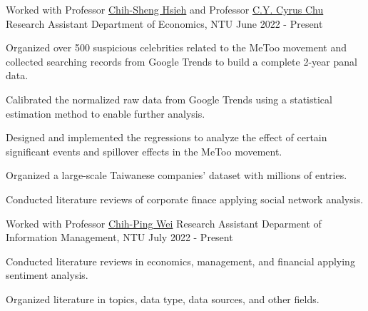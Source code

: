 \newcommand{\prof}[2]{Professor \textcolor{awesome}{\href{#1}{#2}}}

\begin{cventries}

  \cventry
  {Worked with \prof{https://sites.google.com/site/chihshenghsieh/}{Chih-Sheng Hsieh}
  and \prof{https://sites.google.com/view/cyruschu}{C.Y. Cyrus Chu}}
    {Research Assistant} %
    {Department of Economics, NTU} %
    {June 2022 - Present} %
    {
        \begin{cvitems}
        \item {Organized over 500 suspicious celebrities 
            related to the MeToo movement
            and collected searching records from Google Trends 
            to build a complete 2-year panal data.}
        \item {Calibrated the normalized raw data from Google Trends
            using a statistical estimation method
            to enable further analysis.}
        \item {Designed and implemented the regressions 
            to analyze the effect of certain significant events and 
            spillover effects in the MeToo movement.}
        \item {Organized a large-scale Taiwanese companies' dataset
            with millions of entries.}
        \item {Conducted literature reviews of corporate finace 
                applying social network analysis.}
        \end{cvitems}
    }

    \cventry
    {Worked with \prof{https://management.ntu.edu.tw/en/IM/faculty/teacher/sn/15}{Chih-Ping Wei}} %
    {Research Assistant} %
    {Deparment of Information Management, NTU} %
    {July 2022 - Present} %
    {
        \begin{cvitems}
        \item Conducted literature reviews in economics, management,
            and financial applying sentiment analysis.
        \item Organized literature in topics, data type,
            data sources, and other fields.
        \end{cvitems}
    }


\end{cventries}
